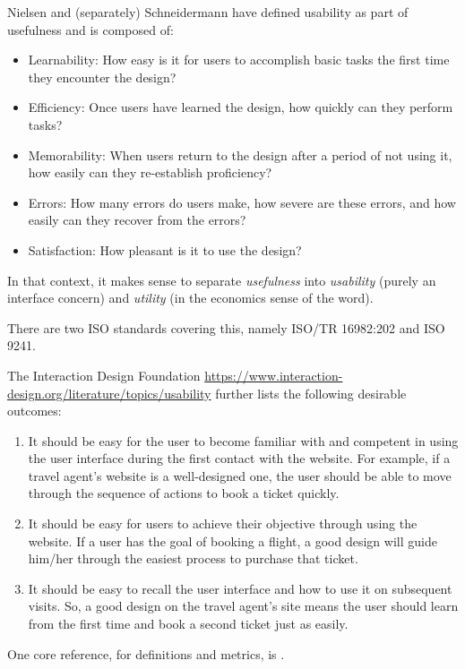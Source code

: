 \documentclass[letterpaper,cleveref]{lipics-v2019}
\theoremstyle{definition}
\begin{document}
Nielsen and (separately) Schneidermann have defined usability as part of
usefulness and
is composed of:
\begin{itemize}
	\item Learnability: How easy is it for users to accomplish basic tasks the
	first time they encounter the design?
	\item Efficiency: Once users have learned the design, how quickly can they
	perform tasks?
	\item Memorability: When users return to the design after a period of not using
	it, how easily can they re-establish proficiency?
	\item Errors: How many errors do users make, how severe are these errors, and
	how easily can they recover from the errors?
	\item Satisfaction: How pleasant is it to use the design?
\end{itemize}
In that context, it makes sense to separate \emph{usefulness} into
\emph{usability} (purely an interface concern) and \emph{utility} (in the
economics
sense of the word).

There are two ISO standards covering this, namely ISO/TR 16982:202 and ISO 9241.


The Interaction Design Foundation
\url{https://www.interaction-design.org/literature/topics/usability} further
lists the following desirable outcomes:

\begin{enumerate}
\item It should be easy for the user to become familiar with and competent in
  using the user interface during the first contact with the website. For
  example, if a travel agent’s website is a well-designed one, the user should
  be able to move through the sequence of actions to book a ticket quickly.
\item It should be easy for users to achieve their objective through using the
  website. If a user has the goal of booking a flight, a good design will guide
  him/her through the easiest process to purchase that ticket.
\item It should be easy to recall the user interface and how to use it on
  subsequent visits. So, a good design on the travel agent’s site means the user
  should learn from the first time and book a second ticket just as easily.
\end{enumerate}

One core reference, for definitions and metrics, is
\citet{bevan1995measuring}.
\end{document}
